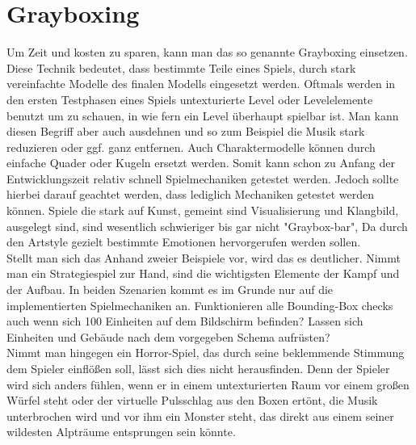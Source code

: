 \section{Grayboxing}
\label{sec:ext_grayboxing}

Um Zeit und kosten zu sparen, kann man das so genannte Grayboxing einsetzen. Diese Technik bedeutet, dass bestimmte Teile eines Spiels, durch stark vereinfachte Modelle des finalen Modells eingesetzt werden. Oftmals werden in den ersten Testphasen eines Spiels untexturierte Level oder Levelelemente benutzt um zu schauen, in wie fern ein Level überhaupt spielbar ist. Man kann diesen Begriff aber auch ausdehnen und so zum Beispiel die Musik stark reduzieren oder ggf. ganz entfernen. Auch Charaktermodelle können durch einfache Quader oder Kugeln ersetzt werden. Somit kann schon zu Anfang der Entwicklungszeit relativ schnell Spielmechaniken getestet werden. Jedoch sollte hierbei darauf geachtet werden, dass lediglich Mechaniken getestet werden können. Spiele die stark auf Kunst, gemeint sind Visualisierung und Klangbild, ausgelegt sind, sind wesentlich schwieriger bis gar nicht "Graybox-bar", Da durch den Artstyle gezielt bestimmte Emotionen hervorgerufen werden sollen. \\ Stellt man sich das Anhand zweier Beispiele vor, wird das es deutlicher. Nimmt man ein Strategiespiel zur Hand, sind die wichtigsten Elemente der Kampf und der Aufbau. In beiden Szenarien kommt es im Grunde nur auf die implementierten Spielmechaniken an. Funktionieren alle Bounding-Box checks auch wenn sich 100 Einheiten auf dem Bildschirm befinden? Lassen sich Einheiten und Gebäude nach dem vorgegeben Schema aufrüsten? \\ Nimmt man hingegen ein Horror-Spiel, das durch seine beklemmende Stimmung dem Spieler einflößen soll, lässt sich dies nicht herausfinden. Denn der Spieler wird sich anders fühlen, wenn er in einem untexturierten Raum vor einem großen Würfel steht oder der virtuelle Pulsschlag aus den Boxen ertönt, die Musik unterbrochen wird und vor ihm ein Monster steht, das direkt aus einem seiner wildesten Alpträume entsprungen sein könnte. \cite[S. 300]{Adams:1515529}